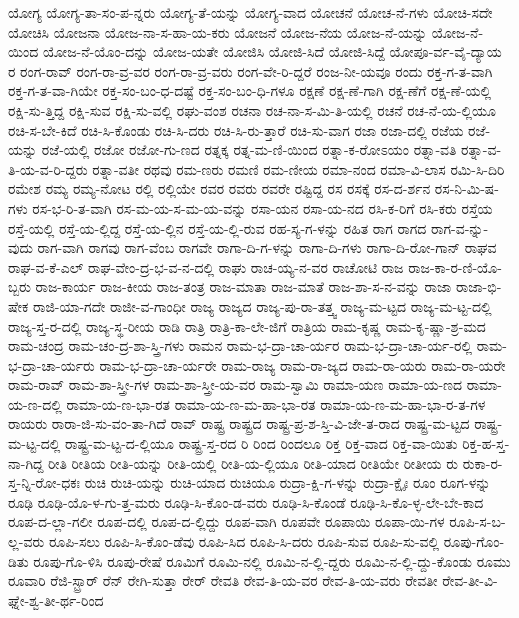 {ಯೋಗ್ಯ
ಯೋಗ್ಯ-ತಾ-ಸಂ-ಪ-ನ್ನರು
ಯೋಗ್ಯ-ತೆ-ಯನ್ನು
ಯೋಗ್ಯ-ವಾದ
ಯೋಚನೆ
ಯೋಚ-ನೆ-ಗಳು
ಯೋಚಿ-ಸದೇ
ಯೋಚಿಸಿ
ಯೋಜನಾ
ಯೋಜ-ನಾ-ಸ-ಹಾ-ಯ-ಕರು
ಯೋಜನೆ
ಯೋಜ-ನೆಯ
ಯೋಜ-ನೆ-ಯನ್ನು
ಯೋಜ-ನೆ-ಯಿಂದ
ಯೋಜ-ನೆ-ಯೊಂ-ದನ್ನು
ಯೋಜ-ಯತೇ
ಯೋಜಿಸಿ
ಯೋಜಿ-ಸಿದೆ
ಯೋಜಿ-ಸಿದ್ದೆ
ಯೋಪೂ-ರ್ವ-ವೈ-ದ್ಯಾಯ
ರ
ರಂಗ-ರಾವ್
ರಂಗ-ರಾ-ವ್ರ-ವರ
ರಂಗ-ರಾ-ವ್ರ-ವರು
ರಂಗ-ವೇ-ರಿ-ದ್ದರೆ
ರಂಜ-ನೀ-ಯವೂ
ರಂದು
ರಕ್ತ-ಗ-ತ-ವಾಗಿ
ರಕ್ತ-ಗ-ತ-ವಾ-ಗಿಯೇ
ರಕ್ತ-ಸಂ-ಬಂ-ಧ-ದಷ್ಟೆ
ರಕ್ತ-ಸಂ-ಬಂ-ಧಿ-ಗಳೂ
ರಕ್ಷಣೆ
ರಕ್ಷ-ಣೆ-ಗಾಗಿ
ರಕ್ಷ-ಣೆಗೆ
ರಕ್ಷ-ಣೆ-ಯಲ್ಲಿ
ರಕ್ಷಿ-ಸು-ತ್ತಿದ್ದ
ರಕ್ಷಿ-ಸುವ
ರಕ್ಷಿ-ಸು-ವಲ್ಲಿ
ರಘು-ವಂಶ
ರಚನಾ
ರಚ-ನಾ-ಸ-ಮಿ-ತಿ-ಯಲ್ಲಿ
ರಚನೆ
ರಚ-ನೆ-ಯ-ಲ್ಲಿಯೂ
ರಚಿ-ಸ-ಬೇ-ಕಿದೆ
ರಚಿ-ಸಿ-ಕೊಂಡು
ರಚಿ-ಸಿ-ದರು
ರಚಿ-ಸಿ-ರು-ತ್ತಾರೆ
ರಚಿ-ಸು-ವಾಗ
ರಜಾ
ರಜಾ-ದಲ್ಲಿ
ರಜೆಯ
ರಜೆ-ಯನ್ನು
ರಜೆ-ಯಲ್ಲಿ
ರಜೋ
ರಜೋ-ಗು-ಣದ
ರತ್ನಕ್ಕ
ರತ್ನ-ಮ-ಣಿ-ಯಿಂದ
ರತ್ನಾ-ಕ-ರೋಽಯಂ
ರತ್ನಾ-ವತಿ
ರತ್ನಾ-ವ-ತಿ-ಯ-ವ-ರಿ-ದ್ದರು
ರತ್ನಾ-ವತೀ
ರಥವು
ರಮ-ಣರು
ರಮಣಿ
ರಮ-ಣೀಯ
ರಮಾ-ನಂದ
ರಮಾ-ವಿ-ಲಾಸ
ರಮಿ-ಸಿ-ದಿರಿ
ರಮೇಶ
ರಮ್ಯ
ರಮ್ಯ-ನೋಟ
ರಲ್ಲಿ
ರಲ್ಲಿಯೇ
ರವರ
ರವರು
ರವರೇ
ರಷ್ಟಿದ್ದ
ರಸ
ರಸಕ್ಕೆ
ರಸ-ದ-ರ್ಶನ
ರಸ-ನಿ-ಮಿ-ಷ-ಗಳು
ರಸ-ಭ-ರಿ-ತ-ವಾಗಿ
ರಸ-ಮ-ಯ-ಸ-ಮ-ಯ-ವನ್ನು
ರಸಾ-ಯನ
ರಸಾ-ಯ-ನದ
ರಸಿ-ಕ-ರಿಗೆ
ರಸಿ-ಕರು
ರಸ್ತೆಯ
ರಸ್ತೆ-ಯಲ್ಲಿ
ರಸ್ತೆ-ಯ-ಲ್ಲಿದ್ದ
ರಸ್ತೆ-ಯ-ಲ್ಲಿನ
ರಸ್ತೆ-ಯ-ಲ್ಲಿ-ರುವ
ರಹ-ಸ್ಯ-ಗ-ಳನ್ನು
ರಹಿತ
ರಾಗ
ರಾಗದ
ರಾಗ-ವ-ನ್ನು-ವುದು
ರಾಗ-ವಾಗಿ
ರಾಗವು
ರಾಗ-ವೆಂಬ
ರಾಗವೇ
ರಾಗಾ-ದಿ-ಗ-ಳನ್ನು
ರಾಗಾ-ದಿ-ಗಳು
ರಾಗಾ-ದಿ-ರೋ-ಗಾನ್
ರಾಘವ
ರಾಘ-ವ-ಕೆ-ಎಲ್
ರಾಘ-ವೇಂ-ದ್ರ-ಭ-ವ-ನ-ದಲ್ಲಿ
ರಾಘು
ರಾಚ-ಯ್ಯ-ನ-ವರ
ರಾಚೋಟಿ
ರಾಜ
ರಾಜ-ಕಾ-ರ-ಣಿ-ಯೊ-ಬ್ಬರು
ರಾಜ-ಕಾರ್ಯ
ರಾಜ-ಕೀಯ
ರಾಜ-ತಂತ್ರ
ರಾಜ-ಮಾತಾ
ರಾಜ-ಮಾತೆ
ರಾಜ-ಶಾ-ಸ-ನ-ವನ್ನು
ರಾಜಾ
ರಾಜಾ-ಭಿ-ಷೇಕ
ರಾಜಿ-ಯಾ-ಗದೇ
ರಾಜೀ-ವ-ಗಾಂಧೀ
ರಾಜ್ಯ
ರಾಜ್ಯದ
ರಾಜ್ಯ-ಪು-ರಾ-ತತ್ತ್ವ
ರಾಜ್ಯ-ಮ-ಟ್ಟದ
ರಾಜ್ಯ-ಮ-ಟ್ಟ-ದಲ್ಲಿ
ರಾಜ್ಯ-ಸ್ತ-ರ-ದಲ್ಲಿ
ರಾಜ್ಯ-ಸ್ಥ-ರೀಯ
ರಾಡಿ
ರಾತ್ರಿ
ರಾತ್ರಿ-ಕಾ-ಲೇ-ಜಿಗೆ
ರಾತ್ರಿಯ
ರಾಮ-ಕೃಷ್ಣ
ರಾಮ-ಕೃ-ಷ್ಣಾ-ಶ್ರ-ಮದ
ರಾಮ-ಚಂದ್ರ
ರಾಮ-ಚಂ-ದ್ರ-ಶಾ-ಸ್ತ್ರಿ-ಗಳು
ರಾಮನ
ರಾಮ-ಭ-ದ್ರಾ-ಚಾ-ರ್ಯರ
ರಾಮ-ಭ-ದ್ರಾ-ಚಾ-ರ್ಯ-ರಲ್ಲಿ
ರಾಮ-ಭ-ದ್ರಾ-ಚಾ-ರ್ಯರು
ರಾಮ-ಭ-ದ್ರಾ-ಚಾ-ರ್ಯರೇ
ರಾಮ-ರಾಜ್ಯ
ರಾಮ-ರಾ-ಜ್ಯದ
ರಾಮ-ರಾ-ಯರು
ರಾಮ-ರಾ-ಯರೇ
ರಾಮ-ರಾವ್
ರಾಮ-ಶಾ-ಸ್ತ್ರೀ-ಗಳ
ರಾಮ-ಶಾ-ಸ್ತ್ರೀ-ಯ-ವರ
ರಾಮ-ಸ್ವಾಮಿ
ರಾಮಾ-ಯಣ
ರಾಮಾ-ಯ-ಣದ
ರಾಮಾ-ಯ-ಣ-ದಲ್ಲಿ
ರಾಮಾ-ಯ-ಣ-ಭಾ-ರತ
ರಾಮಾ-ಯ-ಣ-ಮ-ಹಾ-ಭಾ-ರತ
ರಾಮಾ-ಯ-ಣ-ಮ-ಹಾ-ಭಾ-ರ-ತ-ಗಳ
ರಾಯರು
ರಾರಾ-ಜಿ-ಸು-ವಂ-ತಾ-ಗಿದೆ
ರಾವ್
ರಾಷ್ಟ್ರ
ರಾಷ್ಟ್ರದ
ರಾಷ್ಟ್ರ-ಪ್ರ-ಶ-ಸ್ತಿ-ವಿ-ಜೇ-ತ-ರಾದ
ರಾಷ್ಟ್ರ-ಮ-ಟ್ಟದ
ರಾಷ್ಟ್ರ-ಮ-ಟ್ಟ-ದಲ್ಲಿ
ರಾಷ್ಟ್ರ-ಮ-ಟ್ಟ-ದ-ಲ್ಲಿಯೂ
ರಾಷ್ಟ್ರ-ಸ್ತ-ರದ
ರಿ
ರಿಂದ
ರಿಂದಲೂ
ರಿಕ್ತ
ರಿಕ್ತ-ವಾದ
ರಿಕ್ತ-ವಾ-ಯಿತು
ರಿಕ್ತ-ಹ-ಸ್ತ-ನಾ-ಗಿದ್ದ
ರೀತಿ
ರೀತಿಯ
ರೀತಿ-ಯನ್ನು
ರೀತಿ-ಯಲ್ಲಿ
ರೀತಿ-ಯ-ಲ್ಲಿಯೂ
ರೀತಿ-ಯಾದ
ರೀತಿಯೇ
ರೀತೀಯ
ರು
ರುಕಾ-ರ-ಸ್ತ-ನ್ನಿ-ರೋ-ಧಕಃ
ರುಚಿ
ರುಚಿ-ಯನ್ನು
ರುಚಿ-ಯಾದ
ರುಚಿಯೂ
ರುದ್ರಾ-ಕ್ಷಿ-ಗ-ಳನ್ನು
ರುದ್ರಾ-ಕ್ಷೈಃ
ರೂಂ
ರೂಗ-ಳನ್ನು
ರೂಢಿ
ರೂಢಿ-ಯೊ-ಳ-ಗು-ತ್ತ-ಮರು
ರೂಢಿ-ಸಿ-ಕೊಂ-ಡ-ವರು
ರೂಢಿ-ಸಿ-ಕೊಂಡೆ
ರೂಢಿ-ಸಿ-ಕೊ-ಳ್ಳ-ಲೇ-ಬೇ-ಕಾದ
ರೂಪ-ದ-ಲ್ಲಾ-ಗಲೀ
ರೂಪ-ದಲ್ಲಿ
ರೂಪ-ದ-ಲ್ಲಿದ್ದು
ರೂಪ-ವಾಗಿ
ರೂಪವೇ
ರೂಪಾಯಿ
ರೂಪಾ-ಯಿ-ಗಳ
ರೂಪಿ-ಸ-ಬ-ಲ್ಲ-ವರು
ರೂಪಿ-ಸಲು
ರೂಪಿ-ಸಿ-ಕೊಂ-ಡೆವು
ರೂಪಿ-ಸಿದ
ರೂಪಿ-ಸಿ-ದರು
ರೂಪಿ-ಸುವ
ರೂಪಿ-ಸು-ವಲ್ಲಿ
ರೂಪು-ಗೊಂ-ಡಿತು
ರೂಪು-ಗೊ-ಳಿಸಿ
ರೂಪು-ರೇಷೆ
ರೂಮಿಗೆ
ರೂಮಿ-ನಲ್ಲಿ
ರೂಮಿ-ನ-ಲ್ಲಿ-ದ್ದರು
ರೂಮಿ-ನ-ಲ್ಲಿ-ದ್ದು-ಕೊಂಡು
ರೂಮು
ರೂವಾರಿ
ರೆಜಿ-ಸ್ಟ್ರಾರ್
ರೆನ್
ರೇಗಿ-ಸುತ್ತಾ
ರೇರ್
ರೇವತಿ
ರೇವ-ತಿ-ಯ-ವರ
ರೇವ-ತಿ-ಯ-ವರು
ರೇವತೀ
ರೇವ-ತೀ-ವಿ-ಘ್ನೇ-ಶ್ವ-ತೀ-ರ್ಥ-ರಿಂದ
}
